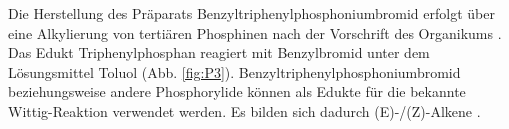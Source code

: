 Die Herstellung des Präparats Benzyltriphenylphosphoniumbromid erfolgt über eine Alkylierung von tertiären Phosphinen nach der Vorschrift des Organikums \cite{ROV}. \newline
Das Edukt Triphenylphosphan reagiert mit Benzylbromid unter dem Lösungsmittel Toluol (Abb. \ref{fig:P3}). \newline
Benzyltriphenylphosphoniumbromid beziehungsweise andere Phosphorylide können als Edukte für die bekannte Wittig-Reaktion verwendet werden. Es bilden sich dadurch (E)-/(Z)-Alkene \cite{ORG}.